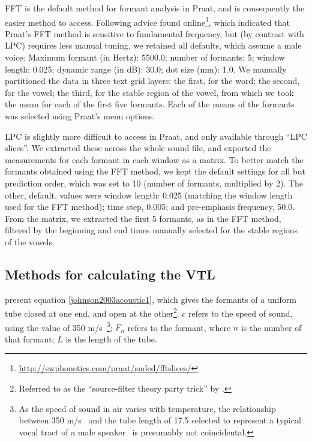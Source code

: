 \documentclass[11pt]{article}
\begin{document}
FFT is the default method for formant analysis in Praat, and is consequently the easier method to access. Following advice found online\footnote{\url{http://swphonetics.com/praat/snded/fftslices/}}, which indicated that Praat's FFT method is sensitive to fundamental frequency, but (by contrast with LPC) requires less manual tuning, we retained all defaults, which assume a male voice: Maximum formant (in Hertz): 5500.0; number of formants: 5; window length: 0.025; dynamic range (in dB): 30.0; dot size (mm): 1.0. We manually partitioned the data in three text grid layers: the first, for the word; the second, for the vowel; the third, for the stable region of the vowel, from which we took the mean for each of the first five formants. Each of the means of the formants was selected using Praat's menu options.

LPC is slightly more difficult to access in Praat, and only available through ``LPC slices''. We extracted these across the whole sound file, and exported the measurements for each formant in each window as a matrix. To better match the formants obtained using the FFT method, we kept the default settings for all but prediction order, which was set to 10 (number of formants, multiplied by 2). The other, default, values were window length: 0.025 (matching the window length used for the FFT method); time step, 0.005; and pre-emphasis frequency, 50.0. From the matrix, we extracted the first 5 formants, as in the FFT method, filtered by the beginning and end times manually selected for the stable regions of the vowels. 


\subsection{Methods for calculating the VTL}
\label{sect:calc}

\citet[p. 267]{paige1970calculation} present equation \ref{johnson2003acoustic1}, which gives the formants of a uniform tube closed at one end, and open at the other\footnote{Referred to as the ``source-filter theory party trick'' by \citet[p. 103]{johnson2003acoustic}.}. $c$ refers to the speed of sound, using the value of 350 m/s~\citep[p. 114]{ladefoged1996elements}\footnote{As the speed of sound in air varies with temperature, the relationship between 350 m/s~\citep[p. 114]{ladefoged1996elements} and the tube length of 17.5 selected to represent a typical vocal tract of a male speaker~\citep[p. 119]{ladefoged1996elements} is presumably not coincidental.}; $F_n$ refers to the formant, where $n$ is the number of that formant; $L$ is the length of the tube.
\end{document}
